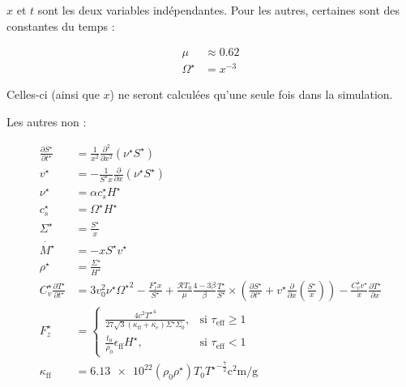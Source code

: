 $x$ et $t$ sont les deux variables indépendantes. Pour les autres, certaines sont des constantes du temps :

\begin{subequations}
    \begin{align}
        \mu &\approx 0.62 \\
        \Omega^\star &= x^{-3}
    \end{align}
\end{subequations}

Celles-ci (ainsi que $x$) ne seront calculées qu’une seule fois dans la simulation.

Les autres non :

\begin{subequations}
    \begin{align}
        \frac{\partial S^\star}{\partial t^\star} &= \frac{1}{x^2} \frac{\partial^2}{\partial x^2} \left(\nu^\star S^\star\right) \\
        v^\star &= - \frac{1}{S^\star x} \frac{\partial}{\partial x} \left(\nu^\star S^\star\right) \\
        \nu^\star &= \alpha c_s^\star H^\star \\
        c_s^\star &= \Omega^\star H^\star \\
        \Sigma^\star &= \frac{S^\star}{x} \\
        \dot{M^\star} &= - x S^\star v^\star \\
        \rho^\star &= \frac{\Sigma^\star}{H^\star} \\
        C_v^\star \frac{\partial T^{\star}}{\partial t^{\star}} &=
        3 v_0^2 \nu^\star {\Omega^\star}^2 - \frac{F_z^\star x}{S^\star} +
        \frac{\mathcal{R} T_0}{\mu} \frac{4-3\beta}{\beta} \frac{T^\star}{S^\star} \times
        \left( \frac{\partial S^\star}{\partial t^\star} + v^\star \frac{\partial}{\partial x} \left(\frac{S^\star}{x}\right) \right) -
        \frac{C_v^\star v^\star}{x} \frac{\partial T^\star}{\partial x} \\
        F_z^\star &=
        \begin{cases}
            \frac{4 c^2 {T^\star}^4}{27 \sqrt{3} (\kappa_\mathrm{ff} + \kappa_e)\Sigma^\star \Sigma_0}, &\text{si $\tau_\mathrm{eff} \geq 1$} \\
            \frac{t_0}{\rho_0}\epsilon_\mathrm{ff} H^\star, &\text{si $\tau_\mathrm{eff} < 1$}
        \end{cases} \\
        \kappa_\mathrm{ff} &= \num{6.13e22} (\rho_0 \rho^\star) {T_0 T^\star}^{-\frac{7}{2}} \si{\square\centi\meter\per\gram} \\

\end{align}
\end{subequations}
